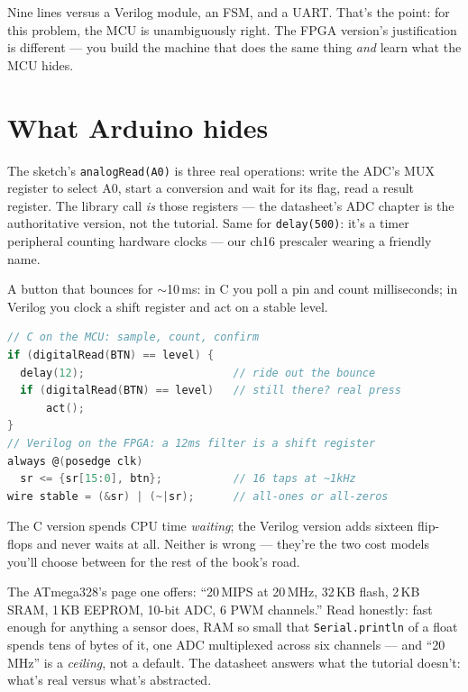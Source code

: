 Nine lines versus a Verilog module, an FSM, and a UART. That's the
point: for this problem, the MCU is unambiguously right. The FPGA
version's justification is different --- you build the machine
that does the same thing \emph{and} learn what the MCU hides.

\section{What Arduino hides}\label{sec:hides19}

The sketch's \texttt{analogRead(A0)} is three real operations:
write the ADC's MUX register to select A0, start a conversion and
wait for its flag, read a result register. The library call
\emph{is} those registers --- the datasheet's ADC chapter is the
authoritative version, not the tutorial. Same for
\texttt{delay(500)}: it's a timer peripheral counting hardware
clocks --- our ch16 prescaler wearing a friendly name.

\begin{example}
A button that bounces for $\sim$10\,ms: in C you poll a pin and
count milliseconds; in Verilog you clock a shift register and act
on a stable level.

\begin{lstlisting}[caption={Debounce both ways (shown, not run):
the C that waits, the Verilog that filters.},language=C]
// C on the MCU: sample, count, confirm
if (digitalRead(BTN) == level) {
  delay(12);                       // ride out the bounce
  if (digitalRead(BTN) == level)   // still there? real press
      act();
}
// Verilog on the FPGA: a 12ms filter is a shift register
always @(posedge clk)
  sr <= {sr[15:0], btn};           // 16 taps at ~1kHz
wire stable = (&sr) | (~|sr);      // all-ones or all-zeros
\end{lstlisting}

The C version spends CPU time \emph{waiting}; the Verilog version
adds sixteen flip-flops and never waits at all. Neither is wrong
--- they're the two cost models you'll choose between for the rest
of the book's road.
\end{example}

\begin{example}
The ATmega328's page one offers: ``20\,MIPS at 20\,MHz, 32\,KB
flash, 2\,KB SRAM, 1\,KB EEPROM, 10-bit ADC, 6 PWM channels.''
Read honestly: fast enough for anything a sensor does, RAM so
small that \texttt{Serial.println} of a float spends tens of
bytes of it, one ADC multiplexed across six channels --- and
``20\,MHz'' is a \emph{ceiling}, not a default. The datasheet
answers what the tutorial doesn't: what's real versus what's
abstracted.
\end{example}

